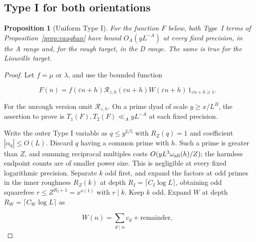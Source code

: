 \documentclass[11pt]{article}
\newtheorem{proposition}[theorem]{Proposition}
\theoremstyle{definition}
\theoremstyle{remark}
\numberwithin{equation}{section}
\begin{document}
\subsection{Type I for both orientations}\label{subsec:general-I}
\begin{proposition}[Uniform Type I]\label{prop:I}
For the function $F$ below, both Type~I terms of
Proposition~\ref{prop:vaughan} have bound $O_A(yL^{-A})$
at every fixed precision, in the A range and, for the rough
target, in the D range. The same is true for the Liouville target.
\end{proposition}
\begin{proof}
Let $f=\mu$ or $\lambda$, and use the bounded function


\begin{equation}
F(n)=f(\varepsilon n+h)\mathcal R_{z,h}(\varepsilon n+h)W(\varepsilon n+h)\,1_{\varepsilon n+h\ge1}.
\end{equation}


For the unrough version omit $\mathcal R_{z,h}$. On a prime dyad of scale $y\ge x/L^B$, the assertion to prove is $T_1(F),T_2(F)\ll_A yL^{-A}$ at each fixed precision.

Write the outer Type I variable as $q\le y^{2/5}$ with $R_Z(q)=1$ and coefficient $|\alpha_q|\le O(L)$. Discard $q$ having a common prime with $h$. Such a prime is greater than $Z$, and summing reciprocal multiples costs $O(yL^3\omega_{\rm all}(h)/Z)$; the harmless endpoint counts are of smaller power size. This is negligible at every fixed logarithmic precision. Separate $k$ odd first, and expand the factors at odd primes in the inner roughness $R_Z(k)$ at depth $R_I=\lceil C_I\log L\rceil$, obtaining odd squarefree $r\le Z^{R_I+1}=x^{o(1)}$ with $r\mid k$. Keep $k$ odd. Expand $W$ at depth $R_W=\lceil C_W\log L\rceil$ as


\begin{equation}
W(n)=\sum_{d\mid n}c_d+\text{remainder},
\end{equation}



\end{proof}
\end{document}
